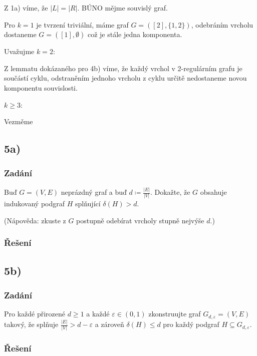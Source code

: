\documentclass[../main.tex]{subfiles}
\begin{document}
Z 1a) víme, že  $|L|=|R|$. BÚNO mějme souvislý graf. 

Pro $k=1$ je tvrzení triviální, máme graf $G=([2], \{1,2\})$, odebráním vrcholu dostaneme $G=([1], \emptyset)$ což je stále jedna komponenta.

Uvažujme $k=2$: 

Z lemmatu dokázaného pro 4b) víme, že každý vrchol v 2-regulárním grafu je součástí cyklu, 
odstraněním jednoho vrcholu z cyklu určitě nedostaneme novou komponentu souvislosti.

$k\geq 3$:

Vezměme 




\subsection{5a)}
\subsubsection*{Zadání}
Buď $G=(V,E)$ neprázdný graf a buď $d \coloneq \frac{|E|}{|V|}$. Dokažte, že $G$ obsahuje indukovaný podgraf $H$ splňující $\delta(H) > d$.

(Nápověda: zkuste z $G$ postupně odebírat vrcholy stupně nejvýše $d$.)

\subsubsection*{Řešení}


\subsection{5b)}
\subsubsection*{Zadání}
Pro každé přirozené $d\geq 1$ a každé $\varepsilon\in(0,1)$ zkonstruujte graf $G_{d,\varepsilon}= (V,E)$
takový, že splňuje $\frac{|E|}{|V|} > d - \varepsilon$ a zároveň $\delta(H)\leq d$ pro každý podgraf $H \subseteq G_{d,\varepsilon}$.


\subsubsection*{Řešení}
\end{document}
